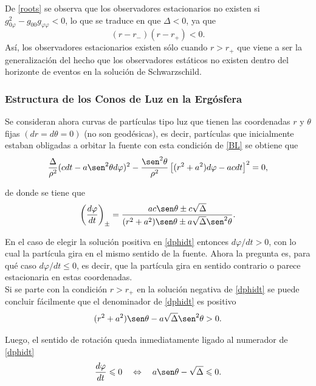 De \eqref{roots} se observa que los observadores estacionarios no existen si $g_{0\varphi}^2-g_{00}g_{\varphi \varphi}<0$, lo que se traduce en que $\Delta <0$, ya que
\begin{equation}
(r-r_-)(r-r_+)<0.
\end{equation}
As\'i, los observadores estacionarios existen s\'olo cuando $r>r_+$ que viene a ser la generalizaci\'on del hecho que los observadores est\'aticos no existen dentro del horizonte de eventos en la soluci\'on de Schwarzschild.\\

\subsubsection{Estructura de los Conos de Luz en la Erg\'osfera}

Se consideran ahora curvas de part\'iculas tipo luz que tienen las coordenadas $r$ y $\theta$ fijas $(dr=d\theta=0)$ (no son geod\'esicas), es decir, part\'iculas que inicialmente estaban obligadas a orbitar la fuente con esta condici\'on de \eqref{BL} se obtiene que
\begin{equation}
\frac{\Delta}{\rho^2}(cdt-a\sen^2\theta d\varphi)^2-\frac{\sen^2\theta}{\rho^2}\left[(r^2+a^2)d\varphi-acdt \right]^2=0,
\end{equation}

de donde se tiene que 
\begin{equation}\label{dphidt}
\left( \frac{d\varphi}{dt} \right) _{\pm}=\frac{ac\sen \theta \pm c\sqrt{\Delta}}{(r^2+a^2)\sen\theta \pm a\sqrt{\Delta}\sen^2\theta}.
\end{equation}

En el caso de elegir la soluci\'on positiva en \eqref{dphidt} entonces  $d\varphi/dt >0$, con lo cual la part\'icula gira en el mismo sentido de la fuente. Ahora la pregunta es, para qu\'e caso  $d\varphi/dt \leqslant 0$, es decir, que la part\'icula gira en sentido contrario o parece estacionaria en estas coordenadas.\\

Si se parte con la condici\'on $r> r_{+}$ en la soluci\'on negativa de \eqref{dphidt} se puede concluir f\'acilmente que el denominador de \eqref{dphidt} es positivo
\begin{equation}
(r^2+a^2)\sen\theta - a\sqrt{\Delta}\sen^2\theta >0.
\end{equation}

Luego, el sentido de rotaci\'on queda inmediatamente ligado al numerador de \eqref{dphidt}
\begin{equation} \label{numerador}
\frac{d\varphi}{dt}  \leqslant   0 \quad  \Leftrightarrow \quad  a\sen \theta - \sqrt{\Delta} \leqslant 0.
\end{equation} 

